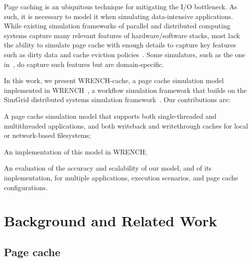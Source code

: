 \documentclass[conference]{IEEEtran}
\newcommand{\simgrid}{SimGrid\xspace}
\newcommand{\wrench}{WRENCH\xspace}
\begin{document}
        Page caching is an ubiquitous technique for mitigating the I/O bottleneck.
        As such, it is necessary to model it
        when simulating data-intensive applications.
        While existing simulation frameworks of parallel and distributed computing
        systems  capture many relevant features of hardware/software stacks, 
        most lack the ability to simulate page cache with enough details to capture key features such
        as dirty data and cache eviction policies~\cite{nunez2012simcan,nunez2012icancloud}. 
        Some simulators, such as the one in~\cite{xu2018saving}, do capture such features
        but are domain-specific. 


    In this work, we present \wrench-cache, a page cache simulation model
    implemented in \wrench~\cite{casanova2020fgcs}, a workflow simulation
    framework that builds on the \simgrid distributed systems simulation
    framework~\cite{casanova2014simgrid}. Our contributions are:
    \begin{compactitem}
        \item A page cache simulation model that supports 
    both single-threaded and multithreaded applications, and both
    writeback and writethrough caches for local or network-based
    filesystems;
        \item An implementation of this model in \wrench; 
        \item An evaluation of the accuracy and scalability of our model, and of its implementation,
              for multiple applications, execution scenarios, and page cache configurations. 
    \end{compactitem}


    \section{Background and Related Work}
    \label{relatedwork}

        \subsection{Page cache}
\end{document}
